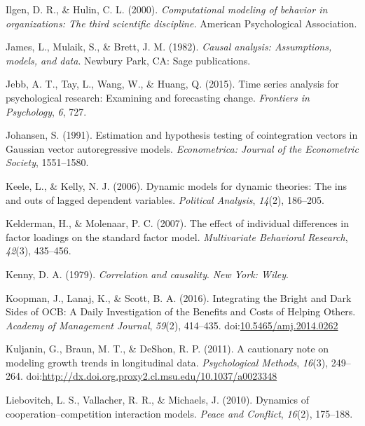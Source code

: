 \documentclass[english,,man]{apa6}
\begin{document}
\leavevmode\hypertarget{ref-ilgen_computational_2000}{}%
Ilgen, D. R., \& Hulin, C. L. (2000). \emph{Computational modeling of behavior in organizations: The third scientific discipline.} American Psychological Association.

\leavevmode\hypertarget{ref-james1982causal}{}%
James, L., Mulaik, S., \& Brett, J. M. (1982). \emph{Causal analysis: Assumptions, models, and data}. Newbury Park, CA: Sage publications.

\leavevmode\hypertarget{ref-jebb_time_2015}{}%
Jebb, A. T., Tay, L., Wang, W., \& Huang, Q. (2015). Time series analysis for psychological research: Examining and forecasting change. \emph{Frontiers in Psychology}, \emph{6}, 727.

\leavevmode\hypertarget{ref-johansen_estimation_1991}{}%
Johansen, S. (1991). Estimation and hypothesis testing of cointegration vectors in Gaussian vector autoregressive models. \emph{Econometrica: Journal of the Econometric Society}, 1551--1580.

\leavevmode\hypertarget{ref-keele_dynamic_2006}{}%
Keele, L., \& Kelly, N. J. (2006). Dynamic models for dynamic theories: The ins and outs of lagged dependent variables. \emph{Political Analysis}, \emph{14}(2), 186--205.

\leavevmode\hypertarget{ref-kelderman2007effect}{}%
Kelderman, H., \& Molenaar, P. C. (2007). The effect of individual differences in factor loadings on the standard factor model. \emph{Multivariate Behavioral Research}, \emph{42}(3), 435--456.

\leavevmode\hypertarget{ref-kenny1979correlation}{}%
Kenny, D. A. (1979). \emph{Correlation and causality}. \emph{New York: Wiley}.

\leavevmode\hypertarget{ref-koopman_integrating_2016}{}%
Koopman, J., Lanaj, K., \& Scott, B. A. (2016). Integrating the Bright and Dark Sides of OCB: A Daily Investigation of the Benefits and Costs of Helping Others. \emph{Academy of Management Journal}, \emph{59}(2), 414--435. doi:\href{https://doi.org/10.5465/amj.2014.0262}{10.5465/amj.2014.0262}

\leavevmode\hypertarget{ref-kuljanin_cautionary_2011}{}%
Kuljanin, G., Braun, M. T., \& DeShon, R. P. (2011). A cautionary note on modeling growth trends in longitudinal data. \emph{Psychological Methods}, \emph{16}(3), 249--264. doi:\href{https://doi.org/http://dx.doi.org.proxy2.cl.msu.edu/10.1037/a0023348}{http://dx.doi.org.proxy2.cl.msu.edu/10.1037/a0023348}

\leavevmode\hypertarget{ref-liebovitch2010dynamics}{}%
Liebovitch, L. S., Vallacher, R. R., \& Michaels, J. (2010). Dynamics of cooperation--competition interaction models. \emph{Peace and Conflict}, \emph{16}(2), 175--188.
\end{document}

